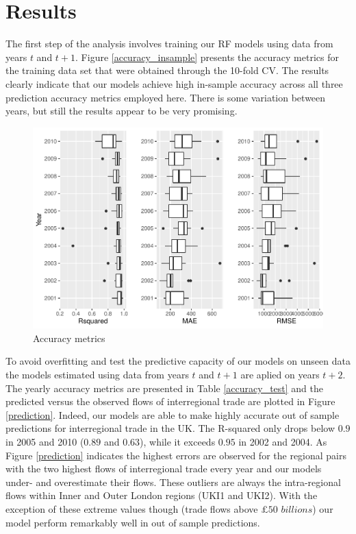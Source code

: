 \documentclass[]{interact}
\theoremstyle{plain}%
\theoremstyle{definition}
\theoremstyle{remark}
\begin{document}
\hypertarget{sec:5}{%
\section{Results}\label{sec:5}}

The first step of the analysis involves training our RF models using
data from years \(t\) and \(t + 1\). Figure \ref{accuracy_insample}
presents the accuracy metrics for the training data set that were
obtained through the 10-fold CV. The results clearly indicate that our
models achieve high in-sample accuracy across all three prediction
accuracy metrics employed here. There is some variation between years,
but still the results appear to be very promising.

\begin{figure}[p]
\includegraphics[width=1\linewidth]{hl_files/figure-latex/unnamed-chunk-3-1} \caption{\label{accuracy_insample}Accuracy metrics}\label{fig:unnamed-chunk-3}
\end{figure}

To avoid overfitting and test the predictive capacity of our models on
unseen data the models estimated using data from years \(t\) and
\(t + 1\) are aplied on years \(t + 2\). The yearly accuracy metrics are
presented in Table \ref{accuracy_test} and the predicted versus the
observed flows of interregional trade are plotted in Figure
\ref{prediction}. Indeed, our models are able to make highly accurate
out of sample predictions for interregional trade in the UK. The
R-squared only drops below \(0.9\) in 2005 and 2010 (\(0.89\) and
\(0.63\)), while it exceeds \(0.95\) in 2002 and 2004. As Figure
\ref{prediction} indicates the highest errors are observed for the
regional pairs with the two highest flows of interregional trade every
year and our models under- and overestimate their flows. These outliers
are always the intra-regional flows within Inner and Outer London
regions (UKI1 and UKI2). With the exception of these extreme values
though (trade flows above \(\pounds 50\) \(billions\)) our model perform
remarkably well in out of sample predictions.
\end{document}
